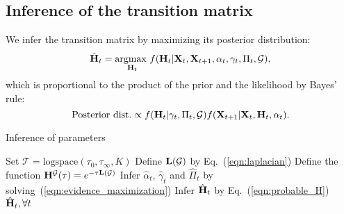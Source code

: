 \documentclass[journal]{IEEEtran}
\begin{document}
\subsection{Inference of the transition matrix}
We infer the transition matrix by maximizing its posterior distribution:
\begin{equation}
    {\hat{\bf{H}}}_t=\underset{{\bf{H}}_t}{\text{argmax }}f({\bf{H}}_t|{\bf{X}}_{t},{\bf{X}}_{t+1},\alpha_t,\gamma_t,\Pi_t,\mathcal{G}),
\end{equation}
which is proportional to the product of the prior and the likelihood by Bayes' rule:
\begin{equation}\label{eqn:bayes_rule}
\text{Posterior dist.}\propto f({\bf{H}}_{t}|\gamma_t,\Pi_t,\mathcal{G})f({\bf{X}}_{t+1}|{\bf{X}}_{t},{\bf{H}}_{t},\alpha_t).
\end{equation}

\begin{algorithm}[t!]
  \caption{Inference of parameters}\label{algo:inference_of_parameters}
  \begin{algorithmic}[1]
    \State Set $\mathcal{T}=\text{logspace}(\tau_0,\tau_\infty,K)$
    \State Define ${\bf{L}}(\mathcal{G})$ by Eq.~(\ref{eqn:laplacian})
    \State Define the function ${\bf{H}}^\mathcal{G}(\tau)=e^{-\tau{\bf{L}}(\mathcal{G})}$
    \State Infer $\hat\alpha_t$, $\hat\gamma_t$ and $\hat\Pi_t$ by solving~(\ref{eqn:evidence_maximization})
    \State Infer $\hat{\bf{H}}_t$ by Eq.~(\ref{eqn:probable_H})
    \EndFor\\
    \Return $\hat{\bf{H}}_t, \forall t$
    \EndFunction
  \end{algorithmic}
\end{algorithm}
\end{document}
